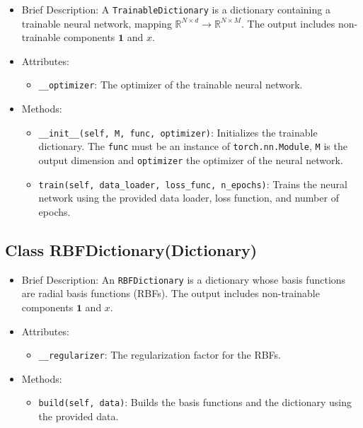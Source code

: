 \begin{itemize}
\item Brief Description: A \lstinline|TrainableDictionary|
  is a dictionary containing a trainable neural network,
  mapping $\mathbb{R}^{N \times d} \rightarrow \mathbb{R}^{N \times M}$.
  The output includes non-trainable components $\mathbf{1}$ and $x$.
\item Attributes:
  \begin{itemize}
  \item \lstinline|__optimizer|: The optimizer of the trainable neural network.
  \end{itemize}
\item Methods:
  \begin{itemize}
  \item \lstinline|__init__(self, M, func, optimizer)|:
  Initializes the trainable dictionary.
  The \lstinline|func| must be an instance of \lstinline|torch.nn.Module|,
  \lstinline|M| is the output dimension and \lstinline|optimizer| the optimizer
  of the neural network.
  \item \lstinline|train(self, data_loader, loss_func, n_epochs)|:
  Trains the neural network using the provided data loader, loss function,
  and number of epochs.
  \end{itemize}
\end{itemize}

\subsection{Class RBFDictionary(Dictionary)}

\begin{itemize}
\item Brief Description:
  An \lstinline|RBFDictionary| is a dictionary
  whose basis functions are radial basis functions (RBFs).
  The output includes non-trainable components $\mathbf{1}$ and $x$.
\item Attributes:
  \begin{itemize}
  \item \lstinline|__regularizer|: The regularization factor for the RBFs.
  \end{itemize}
\item Methods:
  \begin{itemize}
  \item \lstinline|build(self, data)|: Builds the basis functions and the dictionary
  using the provided data.
  \end{itemize}
\end{itemize}

